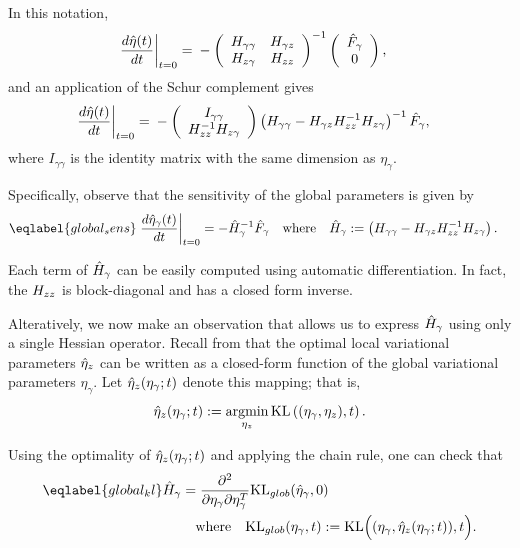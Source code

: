In this notation,
%
\begin{align*}
%
\fracat{d \etaopt(\t)}{d \t}{t = 0} ={}&
-\left(
\begin{array}{cc}
   \hess{\gamma\gamma} & \hess{\gamma\z} \\
   \hess{\z\gamma}     & \hess{\z\z} \\
\end{array}
\right)^{-1}
\left( \begin{array}{c} \crosshessian_\gamma \\ 0 \end{array}\right),
%
\end{align*}
%
and an application of the Schur complement gives
%
\begin{align*}
%
\fracat{d \etaopt(\t)}{d \t}{t = 0} ={}&
-\left(\begin{array}{c}
I_{\gamma\gamma} \\
\hess{\z\z}^{-1} \hess{\z\gamma}
\end{array}\right)
\left(\hess{\gamma\gamma} -
      \hess{\gamma\z} \hess{\z\z}^{-1} \hess{\z\gamma}\right)^{-1} \crosshessian_\gamma,
%
\end{align*}
where $I_{\gamma\gamma}$ is the identity matrix with
the same dimension as $\eta_\gamma$.

Specifically, observe that the sensitivity of the global parameters
is given by
\begin{align}\eqlabel{global_sens}
  \fracat{d \etaopt_\gamma(\t)}{d \t}{t = 0} &=
  - \hessopt_\gamma^{-1}\crosshessian_\gamma
  \mathwhere
  \hessopt_\gamma := \left(\hess{\gamma\gamma} -
        \hess{\gamma\z} \hess{\z\z}^{-1} \hess{\z\gamma}\right).
\end{align}


Each term of $\hat{H}_\gamma$ can be easily computed using automatic differentiation.
In fact, the $H_{zz}$ is block-diagonal and has a closed form inverse.

Alteratively, we now make an observation that allows us to express $\hat{H}_\gamma$
using only a single Hessian operator.
Recall from  that the optimal local variational parameters $\hat\eta_{z}$ can be written
as a closed-form function of the global variational parameters $\eta_\gamma$.
Let $\hat\eta_{z}(\eta_\gamma; t)$ denote this mapping; that is,
\begin{align*}
  \hat\eta_{z}(\eta_\gamma; t) := \operatorname*{\mathrm{argmin}}_{\eta_z} \mathrm{KL}\left((\eta_\gamma, \eta_z), t\right).
\end{align*}

Using the optimality of $\hat\eta_{z}(\eta_\gamma; t)$ and applying the chain rule, one can check that
\begin{align}\eqlabel{global_kl}
\hessopt_{\gamma} &=
\frac{\partial^2}{\partial\eta_\gamma\partial\eta_\gamma^T} \mathrm{KL}_{glob}(\etaopt_\gamma, 0) \\
& \mathwhere
\mathrm{KL}_{glob}(\eta_\gamma, \t) := \mathrm{KL}\Big((\eta_\gamma, \etaoptz(\eta_\gamma; \t)), \t\Big).
\notag
\end{align}

